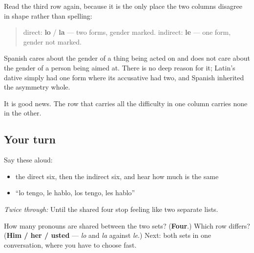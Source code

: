 \begin{grammarlens}[title={Grammar Lens: the one asymmetry}]
Read the third row again, because it is the only place the two columns disagree in shape rather than spelling:

\begin{quote}
direct: \textbf{lo} / \textbf{la} — two forms, gender marked. indirect: \textbf{le} — one form, gender not marked.
\end{quote}

Spanish cares about the gender of a thing being acted on and does not care about the gender of a person being aimed at. There is no deep reason for it; Latin's dative simply had one form where its accusative had two, and Spanish inherited the asymmetry whole.

It is good news. The row that carries all the difficulty in one column carries none in the other.
\end{grammarlens}

\subsection*{Your turn}
Say these aloud:

\begin{itemize}
\raggedright
  \item the direct six, then the indirect six, and hear how much is the same
  \item \textquotedblleft{}lo tengo, le hablo, los tengo, les hablo\textquotedblright{}
\end{itemize}

\emph{Twice through:} Until the shared four stop feeling like two separate lists.

\begin{tcolorbox}[breakable,colback=teal!4,colframe=teal!35!black,title={Before you move on}]
How many pronouns are shared between the two sets? (\textbf{Four}.) Which row differs? (\textbf{Him / her / usted} — \emph{lo} and \emph{la} against \emph{le}.) Next: both sets in one conversation, where you have to choose fast.
\end{tcolorbox}
